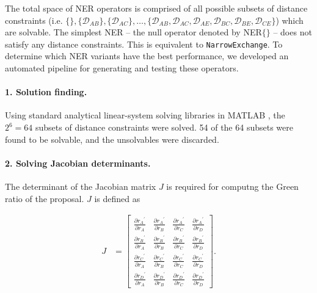 \documentclass[10pt,letterpaper]{article}
\begin{document}
The total space of NER operators is comprised of all possible subsets of distance constraints (i.e. $\{\},\{\mathcal{D}_{AB}\}, \{\mathcal{D}_{AC}\}, \dotso , \{\mathcal{D}_{AB}, \mathcal{D}_{AC}, \mathcal{D}_{AE}, \mathcal{D}_{BC}, \mathcal{D}_{BE}, \mathcal{D}_{CE} \}$) which are solvable. 
The simplest NER -- the null operator denoted by NER$\{\}$ -- does not satisfy any distance constraints. 
This is equivalent to \texttt{NarrowExchange}. 
To determine which NER variants have the best performance, we developed an automated pipeline for generating and testing these operators.


\paragraph{1. Solution finding.} Using standard analytical linear-system solving libraries in MATLAB \cite{higham2016matlab}, the $2^6=64$ subsets of distance constraints were solved. 54 of the 64 subsets were found to be solvable, and the unsolvables were discarded.


\paragraph{2. Solving Jacobian determinants.} The determinant of the Jacobian matrix $J$ is required for computng the Green ratio of the proposal. $J$ is defined as 


\begin{align}
	J &= \begin{bmatrix} \frac{\partial {r_A}^\prime}{\partial r_A} & \frac{\partial {r_A}^\prime}{\partial r_B} & \frac{\partial {r_A}^\prime}{\partial r_C} & \frac{\partial {r_A}^\prime}{\partial r_D} \\
	\frac{\partial {r_B}^\prime}{\partial r_A} & \frac{\partial {r_B}^\prime}{\partial r_B} & \frac{\partial {r_B}^\prime}{\partial r_C} & \frac{\partial {r_B}^\prime}{\partial r_D} \\
	\frac{\partial {r_C}^\prime}{\partial r_A} & \frac{\partial {r_C}^\prime}{\partial r_B} & \frac{\partial {r_C}^\prime}{\partial r_C} & \frac{\partial {r_C}^\prime}{\partial r_D} \\
	\frac{\partial {r_D}^\prime}{\partial r_A} & \frac{\partial {r_D}^\prime}{\partial r_B} & \frac{\partial {r_D}^\prime}{\partial r_C} & \frac{\partial {r_D}^\prime}{\partial r_D} \end{bmatrix}.  \nonumber  \\
\end{align}
\end{document}
